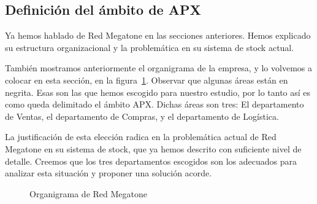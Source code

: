 \subsection{Definición del ámbito de APX}

Ya hemos hablado de Red Megatone en las secciones anteriores. Hemos explicado
su estructura organizacional y la problemática en su sistema de stock actual.

También mostramos anteriormente el organigrama de la empresa, y lo volvemos a
colocar en esta sección, en la figura~\ref{fig:organigrama2}. Observar que
algunas áreas están en negrita. Esas son las que hemos escogido para nuestro
estudio, por lo tanto así es como queda delimitado el ámbito APX. Dichas áreas
son tres: El departamento de Ventas, el departamento de Compras, y el
departamento de Logística.

La justificación de esta elección radica en la problemática actual de Red
Megatone en su sistema de stock, que ya hemos descrito con suficiente nivel de
detalle. Creemos que los tres departamentos escogidos son los adecuados para
analizar esta situación y proponer una solución acorde.

\begin{figure}[h]
  \caption{Organigrama de Red Megatone}
  \label{fig:organigrama2}
\end{figure}

